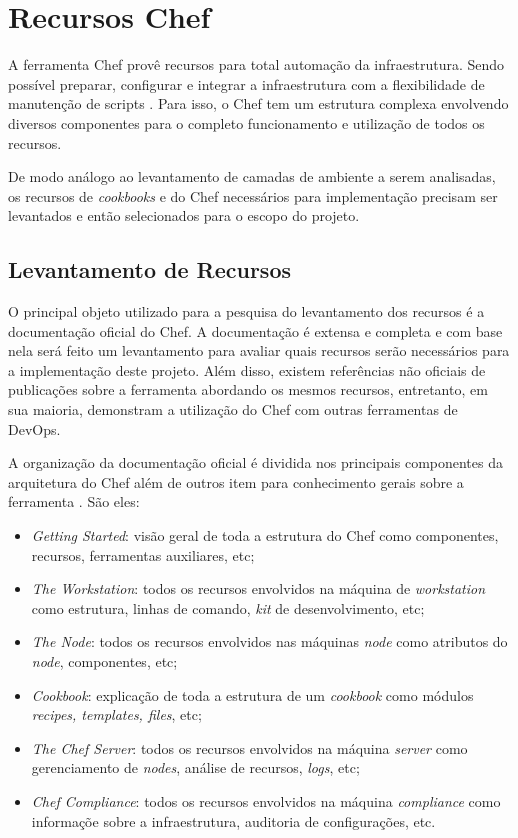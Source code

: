 \section{Recursos Chef}
\label{sec:rec-chef}

A ferramenta Chef provê recursos para total automação da infraestrutura.
Sendo possível preparar, configurar e integrar a infraestrutura com a
flexibilidade de manutenção de scripts \cite{sharma:2015}. Para isso, o
Chef tem um estrutura complexa envolvendo diversos componentes para
o completo funcionamento e utilização de todos os recursos.


De modo análogo ao levantamento de camadas de ambiente a serem analisadas,
os recursos de \textit{cookbooks} e do Chef necessários para implementação precisam
ser levantados e então selecionados para o escopo do projeto.

\subsection{Levantamento de Recursos}
\label{sec:levn-rec}

O principal objeto utilizado para a pesquisa do levantamento dos recursos
é a documentação oficial do Chef. A documentação é extensa e completa e
com base nela será feito um levantamento para avaliar quais recursos
serão necessários para a implementação deste projeto. Além disso, existem
referências não oficiais de publicações sobre a ferramenta abordando os
mesmos recursos, entretanto, em sua maioria, demonstram a utilização do
Chef com outras ferramentas de DevOps.

A organização da documentação oficial é dividida nos principais componentes
da arquitetura do Chef além de outros item para conhecimento gerais sobre a
ferramenta \cite{chefdoc:2016}. São eles:

\begin{itemize}
  \item \textit{Getting Started}: visão geral de toda a estrutura do Chef
    como componentes, recursos, ferramentas auxiliares, etc;
  \item \textit{The Workstation}: todos os recursos envolvidos na máquina de \textit{workstation}
    como estrutura, linhas de comando, \textit{kit} de desenvolvimento, etc;
  \item \textit{The Node}: todos os recursos envolvidos nas máquinas \textit{node}
    como atributos do \textit{node}, componentes, etc;
  \item \textit{Cookbook}: explicação de toda a estrutura de um \textit{cookbook}
    como módulos \textit{recipes, templates, files}, etc;
  \item \textit{The Chef Server}: todos os recursos envolvidos na máquina \textit{server}
    como gerenciamento de \textit{nodes}, análise de recursos, \textit{logs}, etc;
  \item \textit{Chef Compliance}: todos os recursos envolvidos na máquina \textit{compliance}
    como informaçõe sobre a infraestrutura, auditoria de configurações, etc.
\end{itemize}

